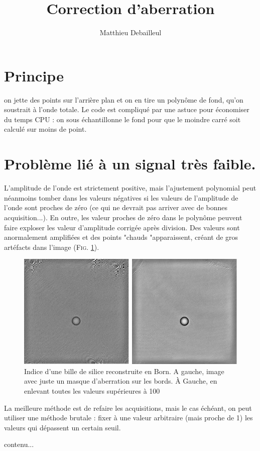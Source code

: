 \documentclass[	french,DIV=calc,%
							paper=a4,%
							fontsize=11pt,%
							twocolumn]{scrartcl}	 					%
\title{Correction d'aberration}
\date{}
\author{Matthieu Debailleul}
\begin{document}
	\maketitle
\section{Principe}
on jette des points sur l'arrière plan et on en tire un polynôme de fond, qu'on soustrait à l'onde totale. Le code est compliqué par une astuce pour économiser du temps CPU : on sous échantillonne le fond pour que le moindre carré soit calculé sur moins de point.


\section{Problème lié à un signal très faible.}

L'amplitude de l'onde est strictement positive, mais l'ajustement polynomial peut néanmoins tomber dans les valeurs négatives si les valeurs de l'amplitude de l'onde sont proches de zéro (ce qui ne devrait pas arriver avec de bonnes acquisition...). En outre, les valeur proches de zéro dans le polynôme peuvent faire exploser les valeur d'amplitude corrigée après division. 
Des valeurs sont anormalement amplifiées et des points "chauds "apparaissent, créant de gros artéfacts dans l'image (\textsc{Fig. }\ref{indice_perturbe}). 
\begin{figure}
	\includegraphics[scale=0.7]{images/indice_perturbe_division.pdf}
	\caption{Indice d'une bille de silice reconstruite en Born. A gauche, image avec juste un masque d'aberration sur les  bords. À Gauche, en enlevant toutes les valeurs supérieures à 100}\label{indice_perturbe}
\end{figure}
La meilleure méthode est de refaire les acquisitions, mais le cas échéant, on peut utiliser une méthode brutale : fixer à une valeur arbitraire (mais proche de 1) les valeurs qui dépassent un certain seuil.
	\begin{thebibliography}{widestlabel}
		
		contenu...
	\end{thebibliography}
\end{document}
